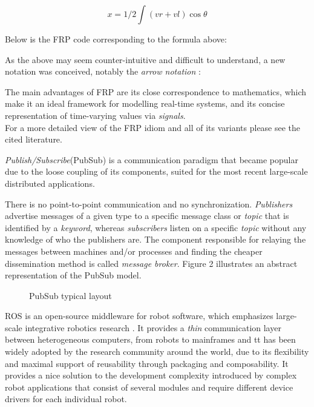 \documentclass{dithesis}
\begin{document}
$$ x = 1/2 \int (vr + vl) \cos\theta $$ 

Below is the FRP code corresponding to the formula above:


As the above may seem counter-intuitive and difficult to understand, a new notation was conceived, notably the \textit{arrow notation} \cite{arrows_notation}:


The main advantages of FRP are its close correspondence to mathematics, which make it an ideal framework for modelling real-time systems, and its concise representation of time-varying values via \textit{signals}. \\
For a more detailed view of the FRP idiom and all of its variants please see the cited literature.


\textit{Publish/Subscribe}(PubSub) is a communication paradigm that became popular due to the loose coupling of its components, suited for the most recent large-scale distributed applications.

There is no point-to-point communication and no synchronization. \textit{Publishers} advertise messages of a given type to a specific message class or \textit{topic} that is identified by a \textit{keyword}, whereas \textit{subscribers} listen on a specific \textit{topic} without any knowledge of who the publishers are. The component responsible for relaying the messages between machines and/or processes and finding the cheaper dissemination method is called \textit{message broker}. Figure 2 illustrates an abstract representation of the PubSub model.

\begin{figure}[h!] 
	\centering
  	 
  	\caption{PubSub typical layout}
\end{figure}


ROS is an open-source middleware for robot software, which emphasizes large-scale integrative robotics research \cite{ROS}. It provides a \textit{thin} communication layer between heterogeneous computers, from robots to mainframes and tt has been widely adopted by the research community around the world, due to its flexibility and maximal support of reusability through packaging and composability. It provides a nice solution to the development complexity introduced by complex robot applications that consist of several modules and require different device drivers for each individual robot. 
\end{document}
